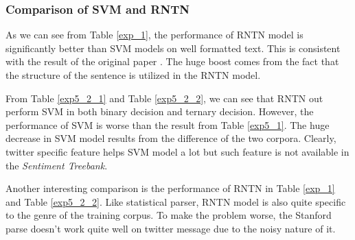 \subsubsection{Comparison of SVM and RNTN}
As we can see from Table \ref{exp_1}, the performance of RNTN model is significantly better than SVM models on well formatted text. This is consistent with the result of the original paper \cite{Socher:2013}. The huge boost comes from the fact that the structure of the sentence is utilized in the RNTN model. 



From Table \ref{exp5_2_1} and Table \ref{exp5_2_2}, we can see that RNTN out perform SVM in both binary decision and ternary decision. However, the performance of SVM is worse than the result from Table \ref{exp5_1}. The huge decrease in SVM model results from the difference of the two corpora. 
Clearly, twitter specific feature helps SVM model a lot but such feature is not available in the \textit{Sentiment Treebank}. 

Another interesting comparison is the performance of RNTN in Table \ref{exp_1} and Table \ref{exp5_2_2}. Like statistical parser, RNTN model is also quite specific to the genre of the training corpus. To make the problem worse, the Stanford parse doesn't work quite well on twitter message due to the noisy nature of it. 




